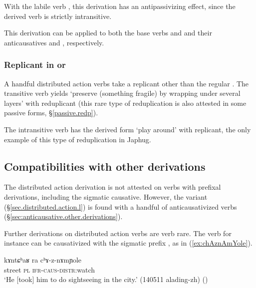 With the labile verb , this derivation has an antipassivizing effect, since the derived verb  is strictly intransitive.

This derivation can be applied to both the base verbs and  and their anticausatives  and , respectively.

\subsubsection{Replicant in  or } \label{sec.distributed.action.oR}
A handful distributed action verbs take a replicant other than the regular . The transitive verb  yields  `preserve (something fragile) by wrapping under several layers' with  reduplicant (this rare type of reduplication is also attested in some passive forms, §\ref{passive.redp}).

The intransitive verb  has the derived form  `play around' with  replicant, the only example of this type of reduplication in Japhug.
\subsection{Compatibilities with other derivations} \label{sec:distributed.action.other}
The distributed action derivation is not attested on verbs with prefixal derivations, including the sigmatic causative. However, the  variant (§\ref{sec.distributed.action.l}) is found with a handful of anticausativized verbs (§\ref{sec:anticausative.other.derivations}).

Further derivations on distributed action verbs are verb rare. The verb  for instance can be causativized with the sigmatic prefix , as in (\ref{ex:chAznAmYole}).

\begin{exe}
\ex \label{ex:chAznAmYole}
\gll kɤntɕʰaʁ ra cʰɤ-z-nɤmɲole \\
street \textsc{pl} \textsc{ifr}-\textsc{caus}-\textsc{distr}:watch \\
\glt `He [took] him to do sightseeing in the city.' (140511 alading-zh) ()
\end{exe}


